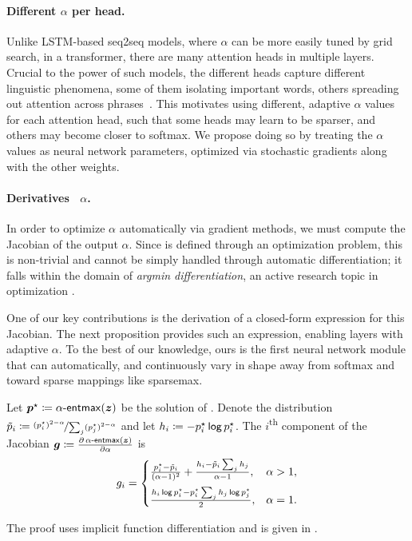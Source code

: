 \paragraph*{Different {\boldmath $\alpha$} per head.}
Unlike LSTM-based seq2seq models, where $\alpha$ can be more easily
tuned by grid search, in a transformer, there are many attention
heads in multiple layers. Crucial to the power of such models, the
different heads capture different linguistic phenomena, some of them
isolating important words, others spreading out attention across
phrases~\citep[Figure~5]{vaswani2017attention}. This motivates using
different, adaptive $\alpha$ values for each attention head, such
that some heads may learn to be sparser, and others may become closer
to softmax. We propose doing so by treating the $\alpha$ values as
neural network parameters, optimized via stochastic gradients along
with the other weights.

\paragraph*{Derivatives \wrt~{\boldmath $\alpha$}.}
In order to optimize $\alpha$ automatically via gradient methods, we
must compute the Jacobian of the \entmaxtext output \wrt $\alpha$.
Since \entmaxtext is defined through an optimization problem, this is
non-trivial and cannot be simply handled through automatic
differentiation; it falls within the domain of \emph{argmin
    differentiation}, an active research topic in optimization
\citep{gould,optnet}.

One of our key contributions is the derivation of a closed-form
expression for this Jacobian. The next proposition provides
such an expression, enabling \entmaxtext layers with
adaptive $\alpha$. To the best of our knowledge, ours is the first
neural network module that can automatically, and continuously vary in
shape away from softmax and toward sparse mappings like sparsemax.

\begin{proposition}\label{prop:grad_alpha}%
    Let $\bm{p}^\star \coloneqq \mathop{\mathsf{\alpha}\textnormal{-}\mathsf{entmax}}(\bm{z})$ be the solution of
    .
    Denote the distribution $\tilde{p}_i \coloneqq \nicefrac{(p_i^\star)^{2 - \alpha}}{
            \sum_j(p_j^\star)^{2-\alpha}}$ and let
    $h_i \coloneqq -p^\star_i \operatorname*{\mathsf{log}} p^\star_i$.
    The $i$\textsuperscript{th} component of the Jacobian
    $\bm{g} \coloneqq \frac{\partial \mathop{\mathsf{\alpha}\textnormal{-}\mathsf{entmax}}(\bm{z})}{\partial \alpha}$ is
    \begin{equation}\label{eq:final_gradient_alpha}
        g_i =%
        \begin{cases}
            \frac{p_i^{\star} - \tilde{\pp}_i}{(\alpha-1)^2} +
            \frac{h_i - \tilde{\pp}_i%
                \sum_j h_j%
            }{\alpha-1},                                                                  & \alpha > 1, \\[1.5ex]
            \frac{h_i \log \pp_i^{\star} - \pp_i^{\star} \sum_j h_j \log p_j^{\star}}{2}, & \alpha = 1.
        \end{cases}
    \end{equation}
\end{proposition}
\noindent%
The proof uses implicit function differentiation and is given in .

